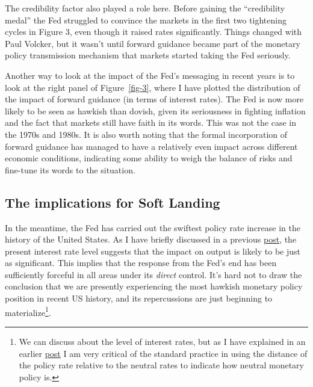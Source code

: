 \documentclass[
  letterpaper,
  DIV=11,
  numbers=noendperiod]{scrartcl}
\begin{document}
The credibility factor also played a role here. Before gaining the
``credibility medal'' the Fed struggled to convince the markets in the
first two tightening cycles in Figure 3, even though it raised rates
significantly. Things changed with Paul Volcker, but it wasn't until
forward guidance became part of the monetary policy transmission
mechanism that markets started taking the Fed seriously.

Another way to look at the impact of the Fed's messaging in recent years
is to look at the right panel of Figure~\ref{fig-3}, where I have
plotted the distribution of the impact of forward guidance (in terms of
interest rates). The Fed is now more likely to be seen as hawkish than
dovish, given its seriousness in fighting inflation and the fact that
markets still have faith in its words. This was not the case in the
1970s and 1980s. It is also worth noting that the formal incorporation
of forward guidance has managed to have a relatively even impact across
different economic conditions, indicating some ability to weigh the
balance of risks and fine-tune its words to the situation.

\hypertarget{the-implications-for-soft-landing}{%
\subsection{The implications for Soft
Landing}\label{the-implications-for-soft-landing}}

In the meantime, the Fed has carried out the swiftest policy rate
increase in the history of the United States. As I have briefly
discussed in a previous
\href{https://msh855.github.io/TheQuantEconomist/posts/fed_and_private_consumption/the_fed_and_private_consumption.html}{post},
the present interest rate level suggests that the impact on output is
likely to be just as significant. This implies that the response from
the Fed's end has been sufficiently forceful in all areas under its
\emph{direct} control. It's hard not to draw the conclusion that we are
presently experiencing the most hawkish monetary policy position in
recent US history, and its repercussions are just beginning to
materialize\footnote{We can discuss about the level of interest rates,
  but as I have explained in an earlier
  \href{https://msh855.github.io/TheQuantEconomist/posts/fed_and_private_consumption/the_fed_and_private_consumption.html}{post}
  I am very critical of the standard practice in using the distance of
  the policy rate relative to the neutral rates to indicate how neutral
  monetary policy is.}.
\end{document}
